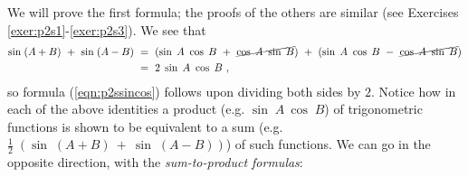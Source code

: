 We will prove the first formula; the proofs of the others are similar (see Exercises
\ref{exer:p2s1}-\ref{exer:p2s3}). We see that
\begin{align*}
 \sin\;(A+B) ~+~ \sin\;(A-B) ~&=~ (\sin\;A~\cos\;B ~+~ \cancel{\cos\;A~\sin\;B}) ~+~
  (\sin\;A~\cos\;B ~-~ \cancel{\cos\;A~\sin\;B})\\
 &=~ 2\;\sin\;A~\cos\;B ~,
\end{align*}
so formula (\ref{eqn:p2ssincos}) follows upon dividing both sides by $2$. Notice how in each of the
above identities a product (e.g. $\sin\;A~\cos\;B$) of trigonometric functions is shown to be
equivalent to a sum (e.g. $\tfrac{1}{2}\;(\sin\;(A+B) ~+~ \sin\;(A-B))$) of such functions. We can
go in the opposite direction, with the \emph{sum-to-product formulas}:

\begin{center}\end{center}

